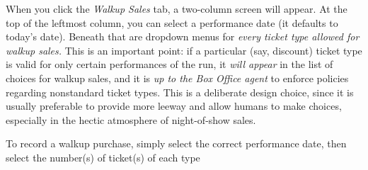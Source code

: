 When you click the \emph{Walkup Sales} tab, a two-column screen will
appear. At the top of the leftmost column, you can select a performance
date (it defaults to today's date).  Beneath that are dropdown menus for
\emph{every ticket type allowed for walkup sales.}  This is an important
point: if a particular (say, discount) ticket type is valid for only
certain performances of the run, it \emph{will appear} in the list of
choices for walkup sales, and it is \emph{up to the Box Office agent} to
enforce policies regarding nonstandard ticket types.  This is a
deliberate design choice, since it is usually preferable to provide more
leeway and allow humans to make choices, especially in the hectic
atmosphere of night-of-show sales.

To record a walkup purchase, simply select the correct performance date,
then select the number(s) of ticket(s) of each type 
